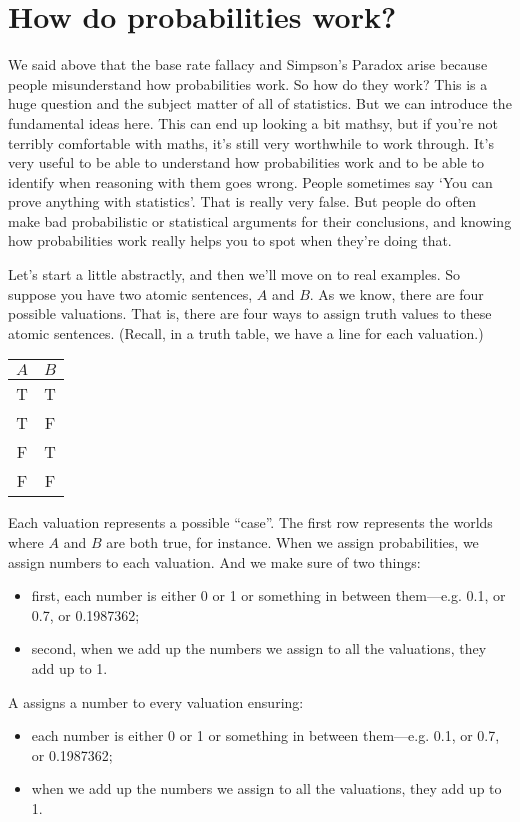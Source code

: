 \section{How do probabilities work?}

We said above that the base rate fallacy and Simpson's Paradox arise because people misunderstand how probabilities work. So how do they work? This is a huge question and the subject matter of all of statistics. But we can introduce the fundamental ideas here. This can end up looking a bit mathsy, but if you're not terribly comfortable with maths, it's still very worthwhile to work through. It's very useful to be able to understand how probabilities work and to be able to identify when reasoning with them goes wrong. People sometimes say `You can prove anything with statistics'. That is really very false. But people do often make bad probabilistic or statistical arguments for their conclusions, and knowing how probabilities work really helps you to spot when they're doing that.

Let's start a little abstractly, and then we'll move on to real examples. So suppose you have two atomic sentences, $A$ and $B$. As we know, there are four possible valuations.  That is, there are four ways to assign truth values to these atomic sentences. (Recall, in a truth table, we have a line for each valuation.)
\begin{center}
\begin{tabular}{cc}
$A$ & $B$ \\
\hline
T & T \\
T & F \\
F & T \\
F & F
\end{tabular}
\end{center}
Each valuation represents a possible ``case''. The first row represents the worlds where $A$ and $B$ are both true, for instance.
When we assign probabilities, we assign numbers to each valuation. And we make sure of two things:
\begin{itemize}
\item first, each number is either 0 or 1 or something in between them---e.g. 0.1, or 0.7, or 0.1987362;
\item second, when we add up the numbers we assign to all the valuations, they add up to 1.
\end{itemize}

\begin{highlighted}
A  assigns a number to every valuation ensuring:
\begin{itemize}
\item each number is either 0 or 1 or something in between them---e.g. 0.1, or 0.7, or 0.1987362;
\item when we add up the numbers we assign to all the valuations, they add up to 1.
\end{itemize}
\end{highlighted}

